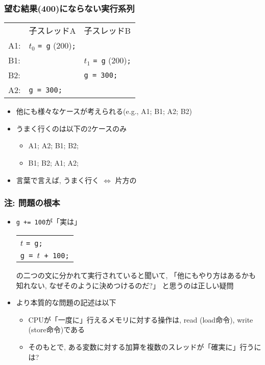 \documentclass[12pt,dvipdfmx]{beamer}
\begin{document}
\begin{frame}
  \frametitle{望む結果(400)にならない実行系列}
  \begin{center}
\begin{tabular}{l|l|l}
    & 子スレッドA                   &  子スレッドB                   \\
A1: & $t_0$ {\tt = g} (200){\tt ;}  &                                \\
B1: &                               &  $t_1$ {\tt = g} (200){\tt ;}  \\
B2: &                               &  {\tt g = 300;}                \\
A2: &  {\tt g = 300;}               &                                \\
\end{tabular}
  \end{center}

\begin{itemize}
\item 他にも様々なケースが考えられる(e.g., A1; B1; A2; B2)
\item うまく行くのは以下の2ケースのみ
  \begin{itemize}
  \item A1; A2; B1; B2;
  \item B1; B2; A1; A2;
  \end{itemize}

\item 言葉で言えば, うまく行く
  $\iff$ 片方の
\end{itemize}
\end{frame}

\begin{frame}
  \frametitle{注: 問題の根本}
  \begin{itemize}
  \item {\tt g += 100}が「実は」

    \begin{tabular}{l}
      $t$ {\tt = g;} \\
      {\tt g = $t$ + 100;} \\
    \end{tabular}

    の二つの文に分かれて実行されていると聞いて,
    「他にもやり方はあるかも知れない, なぜそのように決めつけるのだ?」
    と思うのは正しい疑問
    
  \item より本質的な問題の記述は以下
    \begin{itemize}
    \item CPUが「一度に」行えるメモリに対する操作は,  read (load命令),
      write (store命令)である
    \item そのもとで,
      ある変数に対する加算を複数のスレッドが「確実に」行うには?
    \end{itemize}
  \end{itemize}
\end{frame}
\end{document}
